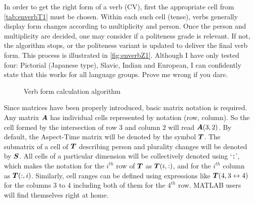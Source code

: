 In order to get the right form of a verb (CV), first the appropriate cell from \autoref{tab:enverbT1} must be chosen. Within each such cell (tense), verbs generally display form changes according to multiplicity and person. Once the person and multiplicity are decided, one may consider if a politeness grade is relevant. If not, the algorithm stops, or the politeness variant is updated to deliver the final verb form. This process is illustrated in \autoref{fig:enverbZ1}. Although I have only tested four: Pictorial (Japanese type), Slavic, Indian and European, I can confidently state that this works for all language groups.  Prove me wrong if you dare. 

\begin{figure}[bth]
    \centering
{}
\caption{Verb form calculation algorithm}
\label{fig:enverbZ1}
\end{figure}
Since matrices have been properly introduced, basic matrix notation is required. Any matrix $\boldsymbol{A}$ has individual cells represented by notation (row, column). So the cell formed by the intersection of row $3$ and column $2$ will read $\boldsymbol{A}(3,2)$.  By default, the Aspect-Time matrix will be denoted by the symbol $\boldsymbol{T}$. The submatrix of a cell of $\boldsymbol{T}$ describing person and plurality changes will be denoted by $\boldsymbol{S}$. All cells of a particular dimension will be collectively denoted using `\texttt{:}', which makes the notation for the $i^{th}$ row of $\boldsymbol{T}$ as $\boldsymbol{T}(i,:)$, and for the $i^{th}$ column as $\boldsymbol{T}(:,i)$. Similarly, cell ranges can be defined using expressions like $\boldsymbol{T}(4,3\leftrightarrow 4)$ for the columns $3$ to $4$ including both of them for the $4^{th}$ row. MATLAB users will find themselves right at home.

